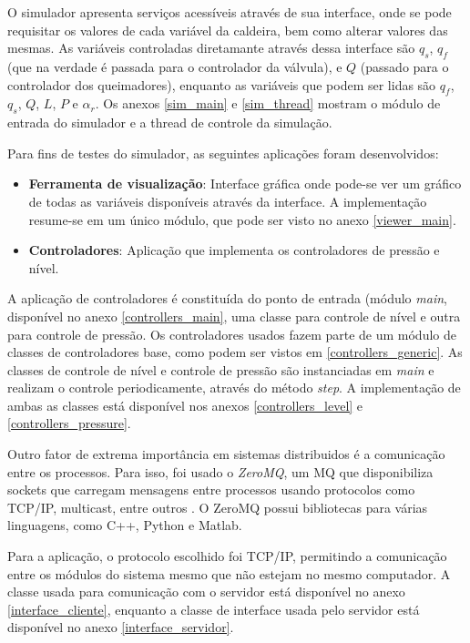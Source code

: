 O simulador apresenta serviços acessíveis através de sua interface,
onde se pode requisitar os valores de cada variável da caldeira, bem
como alterar valores das mesmas. As variáveis controladas diretamante
através dessa interface são $q_s$, $q_f$ (que na verdade é passada
para o controlador da válvula), e $Q$ (passado para o controlador dos
queimadores), enquanto as variáveis que podem ser lidas são $q_f$,
$q_s$, $Q$, $L$, $P$ e $\alpha_r$. Os anexos \ref{sim_main} e
\ref{sim_thread} mostram o módulo de entrada do simulador e a thread
de controle da simulação.

Para fins de testes do simulador, as seguintes aplicações foram
desenvolvidos:
\begin{itemize}
  \item \textbf{Ferramenta de visualização}: Interface gráfica onde
    pode-se ver um gráfico de todas as variáveis disponíveis através
    da interface. A implementação resume-se em um único módulo, que
    pode ser visto no anexo \ref{viewer_main}.
  \item \textbf{Controladores}: Aplicação que implementa os controladores
    de pressão e nível.
\end{itemize}

A aplicação de controladores é constituída do ponto de entrada (módulo
\textit{main}, disponível no anexo \ref{controllers_main}, uma classe
para controle de nível e outra para controle de pressão. Os
controladores usados fazem parte de um módulo de classes de
controladores base, como podem ser vistos em
\ref{controllers_generic}. As classes de controle de nível e controle
de pressão são instanciadas em \textit{main} e realizam o controle
periodicamente, através do método \textit{step}. A implementação de
ambas as classes está disponível nos anexos \ref{controllers_level} e
\ref{controllers_pressure}.


Outro fator de extrema importância em sistemas distribuidos é a
comunicação entre os processos. Para isso, foi usado o
\textit{ZeroMQ}, um MQ que disponibiliza sockets que carregam
mensagens entre processos usando protocolos como TCP/IP, multicast,
entre outros \cite{zmq}. O ZeroMQ possui bibliotecas para várias
linguagens, como C++, Python e Matlab.

Para a aplicação, o protocolo escolhido foi TCP/IP, permitindo a
comunicação entre os módulos do sistema mesmo que não estejam no mesmo
computador. A classe usada para comunicação com o servidor está
disponível no anexo \ref{interface_cliente}, enquanto a classe
de interface usada pelo servidor está disponível no anexo
\ref{interface_servidor}.

